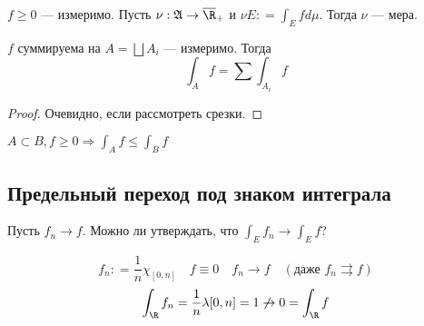 \begin{corollary}
    \(f \geq 0\) --- измеримо. Пусть \(\nu : \mathfrak{A} \to \overline \R_{ +}\) и \(\nu E : = \int_E f d\mu\). Тогда \(\nu\) --- мера.
\end{corollary}

\begin{corollary}
    \(f\) суммируема на \(A = \bigsqcup A_i\) --- измеримо. Тогда
    \[\int_A f = \sum \int_{A_i} f\]
\end{corollary}
\begin{proof}
    Очевидно, если рассмотреть срезки.
\end{proof}
\begin{corollary}
    \(A\subset B, f \geq 0 \Rightarrow \int_A f \leq \int_B f\)
\end{corollary}

\subsection{Предельный переход под знаком интеграла}

Пусть \(f_n \to f\). Можно ли утверждать, что \(\int_E f_n \to \int_E f\)?

\begin{example}[контр]
    \[f_n : = \frac{1}{n} \chi_{[0, n]} \quad f \equiv 0 \quad f_n \to f \quad (\text{даже } f_n \rightrightarrows f)\]
    \[\int_\R f_n = \frac{1}{n}\lambda[0, n] = 1 \not\to 0 = \int_\R f\]
\end{example}

